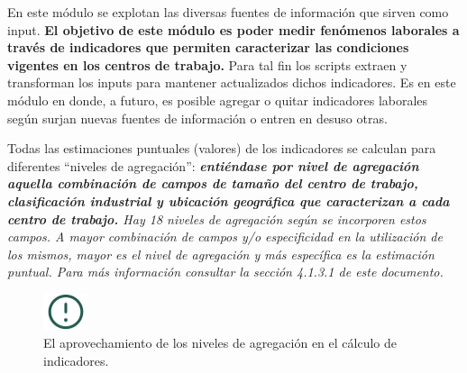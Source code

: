 \documentclass[
]{article}
\begin{document}
En este módulo se explotan las diversas fuentes de información que sirven como input. \textbf{El objetivo de este módulo es poder medir fenómenos laborales a través de indicadores que permiten caracterizar las condiciones vigentes en los centros de trabajo.} Para tal fin los scripts extraen y transforman los inputs para mantener actualizados dichos indicadores. Es en este módulo en donde, a futuro, es posible agregar o quitar indicadores laborales según surjan nuevas fuentes de información o entren en desuso otras.

Todas las estimaciones puntuales (valores) de los indicadores se calculan para diferentes ``niveles de agregación'': \emph{\textbf{entiéndase por nivel de agregación aquella combinación de campos de tamaño del centro de trabajo, clasificación industrial y ubicación geográfica que caracterizan a cada centro de trabajo.} Hay 18 niveles de agregación según se incorporen estos campos. A mayor combinación de campos y/o especificidad en la utilización de los mismos, mayor es el nivel de agregación y más específica es la estimación puntual. Para más información consultar la sección 4.1.3.1 de este documento.}

\begin{figure}
\includegraphics[width=50px,style="float:left; background-color: #f5f5f5; padding-right:1em"]{images-1/important-icon} \caption{El aprovechamiento de los niveles de agregación en el cálculo de indicadores.}\label{fig:utilidadestimacionespuntuales}
\end{figure}
\end{document}
